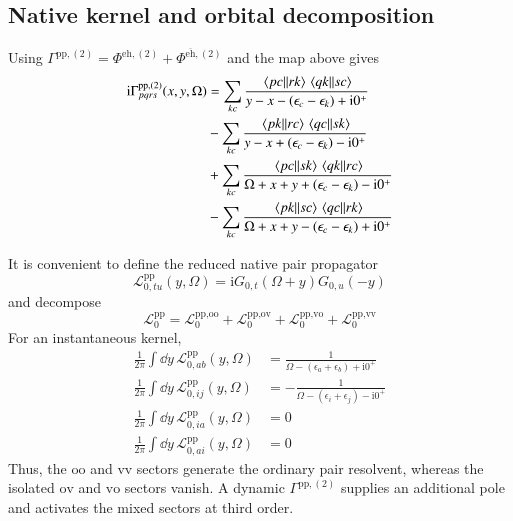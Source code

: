 \documentclass[aip,jcp,reprint,noshowkeys,superscriptaddress]{revtex4-1}
\newcommand{\eps}{\epsilon}
\newcommand{\ii}{\mathrm{i}}
\newcommand{\eh}{\text{eh}}
\newcommand{\teh}{\overline{\text{eh}}}
\newcommand{\pp}{\text{pp}}
\begin{document}
\subsection{Native kernel and orbital decomposition}

Using
$\Gamma^{\pp,(2)}=\Phi^{\eh,(2)}+\Phi^{\teh,(2)}$
and the map above gives
\begin{equation}
\begin{split}
    \ii\Gamma^{\pp,(2)}_{pqrs}(x,y,\Omega)
    &=
    \sum_{kc}
    \frac{
    \mel{pc}{}{rk}\mel{qk}{}{sc}
    }
    {y-x-(\eps_c-\eps_k)+\ii0^+}
    \\
    & -
    \sum_{kc}
    \frac{
    \mel{pk}{}{rc}\mel{qc}{}{sk}
    }
    {y-x+(\eps_c-\eps_k)-\ii0^+}
    \\
    &+
    \sum_{kc}
    \frac{
    \mel{pc}{}{sk}\mel{qk}{}{rc}
    }
    {\Omega+x+y+(\eps_c-\eps_k)-\ii0^+}
    \\
    & -
    \sum_{kc}
    \frac{
    \mel{pk}{}{sc}\mel{qc}{}{rk}
    }
    {\Omega+x+y-(\eps_c-\eps_k)+\ii0^+}
\end{split}
\label{eq:Gamma_pp_second_native_third}
\end{equation}

It is convenient to define the reduced
native pair propagator
\begin{equation}
    \mathcal L_{0,tu}^{\pp}(y,\Omega)
    =
    \ii G_{0,t}(\Omega+y)G_{0,u}(-y)
    \label{eq:L0_pp_reduced_oriented}
\end{equation}
and decompose
\begin{equation}
    \mathcal L_0^\pp
    =
    \mathcal L_0^{\pp,\text{oo}}
    +
    \mathcal L_0^{\pp,\text{ov}}
    +
    \mathcal L_0^{\pp,\text{vo}}
    +
    \mathcal L_0^{\pp,\text{vv}}
    \label{eq:L0_pp_sector_decomposition}
\end{equation}
For an instantaneous kernel,
\begin{align}
    \frac{1}{2\pi}\int\dd{y}\,
    \mathcal L_{0,ab}^{\pp}(y,\Omega)
    &=
    \frac{1}{\Omega-(\eps_a+\eps_b)+\ii0^+}
    \label{eq:pp_vv_integral}
    \\
    \frac{1}{2\pi}\int\dd{y}\,
    \mathcal L_{0,ij}^{\pp}(y,\Omega)
    &=
    -\frac{1}{\Omega-(\eps_i+\eps_j)-\ii0^+}
    \label{eq:pp_oo_integral}
    \\
    \frac{1}{2\pi}\int\dd{y}\,
    \mathcal L_{0,ia}^{\pp}(y,\Omega)
    &=0
    \\
    \frac{1}{2\pi}\int\dd{y}\,
    \mathcal L_{0,ai}^{\pp}(y,\Omega)
    &=0
    \label{eq:pp_mixed_integrals_zero}
\end{align}
Thus, the $\text{oo}$ and $\text{vv}$ sectors generate the ordinary pair resolvent, whereas
the isolated $\text{ov}$ and $\text{vo}$ sectors vanish.
A dynamic $\Gamma^{\pp,(2)}$ supplies an additional pole and activates the
mixed sectors at third order.
\end{document}
